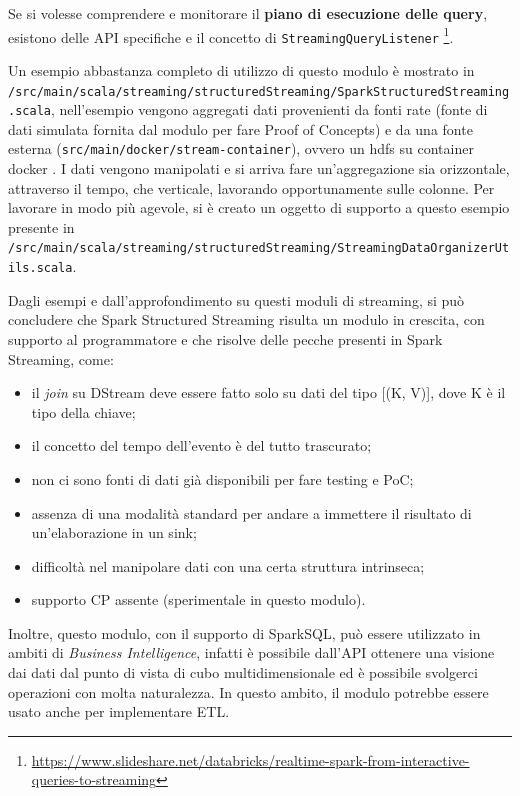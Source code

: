 \documentclass[12pt,italian]{article}
\begin{document}
\par Se si volesse comprendere e monitorare il \textbf{piano di esecuzione delle query}, esistono delle API specifiche e il concetto di \texttt{StreamingQueryListener} \footnote{\url{https://www.slideshare.net/databricks/realtime-spark-from-interactive-queries-to-streaming}}.

\par Un esempio abbastanza completo di utilizzo di questo modulo è mostrato in \texttt{/src/main/scala/streaming/structuredStreaming/SparkStructuredStreaming.scala}, nell'esempio vengono aggregati dati provenienti da fonti rate (fonte di dati simulata fornita dal modulo per fare Proof of Concepts) e da una fonte esterna (\texttt{src/main/docker/stream-container}), ovvero un hdfs su container docker . I dati vengono manipolati e si arriva fare un'aggregazione sia orizzontale, attraverso il tempo, che verticale, lavorando opportunamente sulle colonne. Per lavorare in modo più agevole, si è creato un oggetto di supporto a questo esempio presente in \texttt{/src/main/scala/streaming/structuredStreaming/StreamingDataOrganizerUtils.scala}.

\par Dagli esempi e dall'approfondimento su questi moduli di streaming, si può concludere che Spark Structured Streaming risulta un modulo in crescita, con supporto al programmatore e che risolve delle pecche presenti in Spark Streaming, come:
\begin{itemize}
	\item il \textit{join} su DStream deve essere fatto solo su dati del tipo [(K, V)], dove K è il tipo della chiave;
	\item il concetto del tempo dell'evento è del tutto trascurato;
	\item non ci sono fonti di dati già disponibili per fare testing e PoC;
	\item assenza di una modalità standard per andare a immettere il risultato di un'elaborazione in un sink;
	\item difficoltà nel manipolare dati con una certa struttura intrinseca;
	\item supporto CP assente (sperimentale in questo modulo).
\end{itemize}
Inoltre, questo modulo, con il supporto di SparkSQL, può essere utilizzato in ambiti di \textit{Business Intelligence}, infatti è possibile dall'API ottenere una visione dai dati dal punto di vista di cubo multidimensionale ed è possibile svolgerci operazioni con molta naturalezza. In questo ambito, il modulo potrebbe essere usato anche per implementare ETL.
\end{document}
